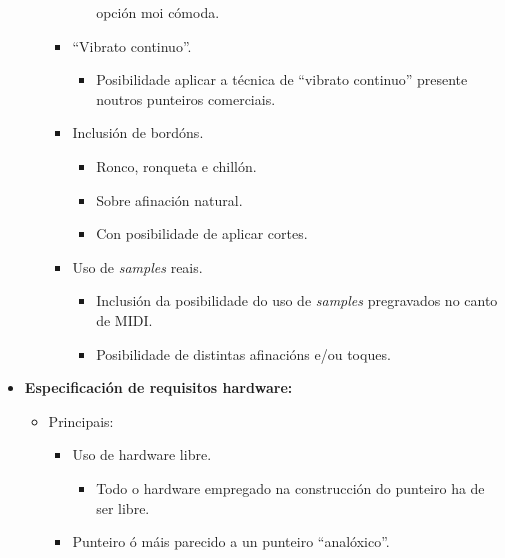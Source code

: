 \begin{itemize}
\begin{itemize}
\begin{itemize}
\begin{itemize}
                              opción moi cómoda.
                       \end{itemize}
                 \item ``Vibrato continuo''.
                       \begin{itemize}
                        \item Posibilidade aplicar a técnica de
                              ``vibrato continuo'' presente noutros punteiros
                              comerciais.
                       \end{itemize}
                 \item Inclusión de bordóns.
                       \begin{itemize}
                        \item Ronco, ronqueta e chillón.
                        \item Sobre afinación natural.
                        \item Con posibilidade de aplicar cortes.
                       \end{itemize}
                 \item Uso de \textit{samples} reais.
                       \begin{itemize}
                        \item Inclusión da posibilidade do uso de
                              \textit{samples} pregravados no canto de MIDI.
                        \item Posibilidade de distintas afinacións e/ou toques.
                       \end{itemize}
                \end{itemize}
         \end{itemize}
   \item \textbf{Especificación de requisitos hardware:}
         \begin{itemize}
          \item Principais:
                \begin{itemize}
                 \item Uso de hardware libre.
                       \begin{itemize}
                        \item Todo o hardware empregado na construcción do
                              punteiro ha de ser libre.
                       \end{itemize}
                 \item Punteiro ó máis parecido a un punteiro ``analóxico''.

\end{itemize}
\end{itemize}
\end{itemize}

